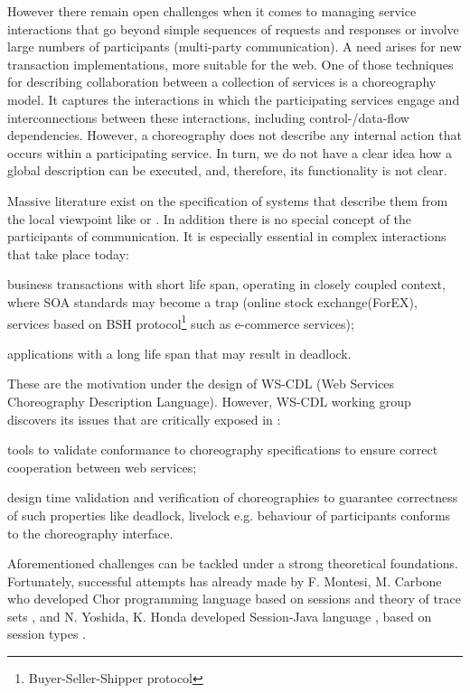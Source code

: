 \documentclass[a4paper]{easychair}
\begin{document}
However there remain open challenges when it comes to managing service interactions that go beyond simple sequences of requests and responses or involve large numbers of participants (multi-party communication). A need arises for new transaction implementations, more suitable for the web. One of those techniques for describing collaboration between a collection of services is a choreography model. It captures the interactions in which the participating services engage and interconnections between these interactions, including control-/data-flow dependencies. However, a choreography does not describe any internal action that occurs within a participating service. In turn, we do not have a clear idea how a global description can be executed, and, therefore, its functionality is not clear.

Massive literature exist on the specification of systems that describe them from the local viewpoint like \cite{cs-processes} or \cite{alg-seq-processes}. In addition there is no special concept of the participants of communication. It is especially essential in complex interactions that take place today: 

	\begin{compactenum}
	   \item business transactions with short life span, operating in closely coupled context, where SOA standards may become a trap (online stock exchange(ForEX), services based on BSH protocol\footnote{Buyer-Seller-Shipper protocol} such as e-commerce services);
	   \item applications with a long life span that may result in deadlock.
	\end{compactenum}
These are the motivation under the design of WS-CDL (Web Services Choreography Description Language). However, WS-CDL working group discovers its issues that are critically exposed in \cite{ws-critical-overview}:
\begin{compactenum}
	\item tools to validate conformance to choreography specifications to ensure correct cooperation between web services;
	\item design time validation and verification of choreographies to guarantee correctness of such properties like deadlock, livelock e.g. behaviour of participants conforms to the choreography interface.
\end{compactenum}

Aforementioned challenges can be tackled under a strong theoretical foundations. Fortunately, successful attempts has already made by F. Montesi, M. Carbone who developed Chor programming language \cite{chor-lang} based on sessions and theory of trace sets \cite{chor-essence}, and N. Yoshida, K. Honda developed Session-Java language \cite{sj-lang}, based on session types \cite{session-types-sessions}.
\end{document}

